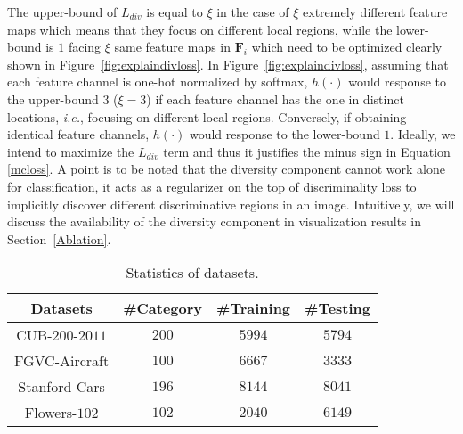 \documentclass[journal]{IEEEtran}
\begin{document}
The upper-bound of $L_{div}$ is equal to $\xi$ in the case of $\xi$ extremely different feature maps which means that they focus on different local regions, while the lower-bound is $1$ facing $\xi$ same feature maps in $\mathbf{F}_i$ which need to be optimized clearly shown in Figure~\ref{fig:explaindivloss}. In Figure~\ref{fig:explaindivloss}, assuming that each feature channel is one-hot normalized by softmax,  $h(\cdot)$ would response to the upper-bound $3$ ($\xi=3$) if each feature channel has the one in distinct locations, \emph{i.e.},  focusing on different local regions. Conversely, if obtaining identical feature channels, $h(\cdot)$ would response to the lower-bound $1$. Ideally, we intend to maximize the $L_{div}$ term and thus it justifies the minus sign in Equation \ref{mcloss}. A point is to be noted that the diversity component cannot work alone for classification, it acts as a regularizer on the top of discriminality loss to implicitly discover different discriminative regions in an image. Intuitively, we will discuss the availability of the diversity component in visualization results in Section~\ref{Ablation}. 








\begin{table}[!t]
  \centering
  \small
\caption{Statistics of datasets.}
    \begin{tabular}{|c|c|c|c|}
    \hline
    Datasets         & \#Category & \#Training & \#Testing \\
    \hline
    \hline
    CUB-$200$-$2011$ & $200$      &$5994$      &$5794$\\
    FGVC-Aircraft    & $100$      &$6667$      &$3333$\\
    Stanford Cars    & $196$      &$8144$      &$8041$\\
    Flowers-$102$    & $102$      &$2040$      &$6149$\\
    \hline
    \end{tabular}\label{tab:datasets}\end{table}
\end{document}
